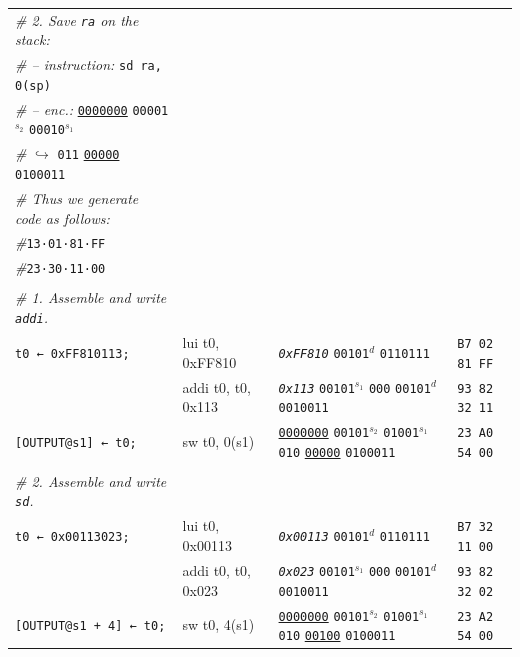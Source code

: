 \documentclass[a4paper,12pt,final]{article}
\begin{document}
\begin{table}[!htbp]
\begin{adjustwidth}{-1cm}{-1cm}
\begin{center}
\begin{tabular}{l|ll|l}
\emph{\# 2. Save \texttt{ra} on the stack:} &  &  & \\[0pt]
\emph{\# – instruction:} \texttt{sd ra, 0(sp)} &  &  & \\[0pt]
\emph{\# – enc.:} \uline{\texttt{0000000}} \texttt{00001}​\(^{s_{2}}\) \texttt{00010}​\(^{s_{1}}\) &  &  & \\[0pt]
\emph{\#}\hspace{3.5em} \(\hookrightarrow\) \texttt{011} \uline{\texttt{00000}} \texttt{0100011} &  &  & \\[0pt]
\emph{\# Thus we generate code as follows:} &  &  & \\[0pt]
\emph{\#}\hspace{1.053000em}​\texttt{13·01·81·FF} &  &  & \\[0pt]
\emph{\#}\hspace{1.053000em}​\texttt{23·30·11·00} &  &  & \\[0pt]
 &  &  & \\[0pt]
\emph{\# 1. Assemble and write \texttt{addi}.} &  &  & \\[0pt]
\texttt{t0 ← 0xFF810113;} & lui t0, 0xFF810 & \emph{\texttt{0xFF810}}                                                  \texttt{00101}​\(^{d}\)  \texttt{0110111} & \texttt{B7 02 81 FF}\\[0pt]
 & addi t0, t0, 0x113 & \emph{\texttt{0x113}}                    \texttt{00101}​\(^{s_{1}}\) \texttt{000} \texttt{00101}​\(^{d}\)  \texttt{0010011} & \texttt{93 82 32 11}\\[0pt]
\texttt{[OUTPUT@s1] ← t0;} & sw t0, 0(s1) & \uline{\texttt{0000000}} \texttt{00101}​\(^{s_{2}}\) \texttt{01001}​\(^{s_{1}}\) \texttt{010} \uline{\texttt{00000}} \texttt{0100011} & \texttt{23 A0 54 00}\\[0pt]
 &  &  & \\[0pt]
\emph{\# 2. Assemble and write \texttt{sd}.} &  &  & \\[0pt]
\texttt{t0 ← 0x00113023;} & lui t0, 0x00113 & \emph{\texttt{0x00113}}                                                  \texttt{00101}​\(^{d}\)  \texttt{0110111} & \texttt{B7 32 11 00}\\[0pt]
 & addi t0, t0, 0x023 & \emph{\texttt{0x023}}                    \texttt{00101}​\(^{s_{1}}\) \texttt{000} \texttt{00101}​\(^{d}\)  \texttt{0010011} & \texttt{93 82 32 02}\\[0pt]
\texttt{[OUTPUT@s1 + 4] ← t0;} & sw t0, 4(s1) & \uline{\texttt{0000000}} \texttt{00101}​\(^{s_{2}}\) \texttt{01001}​\(^{s_{1}}\) \texttt{010} \uline{\texttt{00100}} \texttt{0100011} & \texttt{23 A2 54 00}\\[0pt]

\end{tabular}
\end{center}
\end{adjustwidth}
\end{table}
\end{document}
